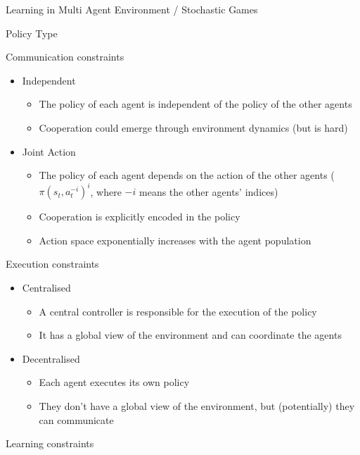 \documentclass[presentation, 8pt]{beamer}\mode<presentation>{\usetheme{AMSBolognaFC}}
\begin{document}
\begin{frame}[allowframebreaks]{Learning in Multi Agent Environment / Stochastic Games}
\begin{exampleblock}{Policy Type}
\begin{itemize}
\begin{itemize}
	\end{itemize}
\end{itemize}
\end{exampleblock}
\begin{exampleblock}{Communication constraints}
\begin{itemize}
	\item Independent
	\begin{itemize}
		\item The policy of each agent is independent of the policy of the other agents
		\item Cooperation could emerge through environment dynamics (but is hard)
	\end{itemize}
	\item Joint Action
	\begin{itemize}
		\item The policy of each agent depends on the action of the other agents ($ \pi(s_t, a^{-i}_t)^i $, where $-i$ means the other agents' indices)
		\item Cooperation is explicitly encoded in the policy
		\item Action space exponentially increases with the agent population
	\end{itemize}
\end{itemize}
\end{exampleblock}
\begin{exampleblock}{Execution constraints}
\begin{itemize}
	\item Centralised
	\begin{itemize}
		\item A central controller is responsible for the execution of the policy
		\item It has a global view of the environment and can coordinate the agents
	\end{itemize}
	\item Decentralised
	\begin{itemize}
		\item Each agent executes its own policy
		\item They don't have a global view of the environment, but (potentially) they can communicate
	\end{itemize}
\end{itemize}
\end{exampleblock}
\begin{exampleblock}{Learning constraints}
\begin{itemize}

\end{itemize}
\end{exampleblock}
\end{frame}
\end{document}
